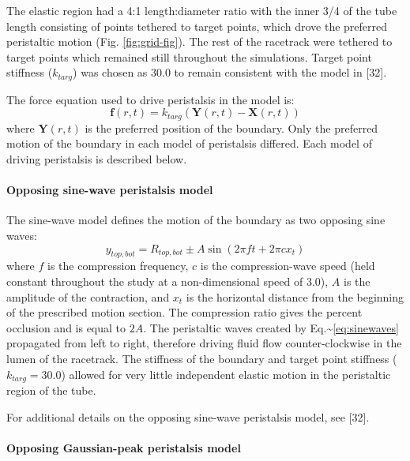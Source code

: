 \documentclass[
]{article}
\begin{document}
The elastic region had a 4:1 length:diameter ratio with the inner 3/4 of
the tube length consisting of points tethered to target points, which
drove the preferred peristaltic motion (Fig. \ref{fig:grid-fig}). The
rest of the racetrack were tethered to target points which remained
still throughout the simulations. Target point stiffness (\(k_{targ}\))
was chosen as 30.0 to remain consistent with the model in {[}32{]}.

The force equation used to drive peristalsis in the model is:
\begin{equation}
\mathbf{f}(r,t) = k_{targ}(\mathbf{Y}(r,t) - \mathbf{X}(r,t))
\label{eq:f}
\end{equation} where \(\mathbf{Y}(r,t)\) is the preferred position of
the boundary. Only the preferred motion of the boundary in each model of
peristalsis differed. Each model of driving peristalsis is described
below.

\hypertarget{opposing-sine-wave-peristalsis-model}{%
\paragraph{Opposing sine-wave peristalsis
model}\label{opposing-sine-wave-peristalsis-model}}

The sine-wave model defines the motion of the boundary as two opposing
sine waves: \begin{equation}
y_{top,bot} = R_{top,bot} \pm A \sin(2\pi f t+ 2\pi cx_t)
\label{eq:sinewaves}
\end{equation} where \(f\) is the compression frequency, \(c\) is the
compression-wave speed (held constant throughout the study at a
non-dimensional speed of 3.0), \(A\) is the amplitude of the
contraction, and \(x_t\) is the horizontal distance from the beginning
of the prescribed motion section. The compression ratio gives the
percent occlusion and is equal to \(2A\). The peristaltic waves created
by Eq.\textasciitilde{}\ref{eq:sinewaves} propagated from left to right,
therefore driving fluid flow counter-clockwise in the lumen of the
racetrack. The stiffness of the boundary and target point stiffness
(\(k_{targ}=30.0\)) allowed for very little independent elastic motion
in the peristaltic region of the tube.

For additional details on the opposing sine-wave peristalsis model, see
{[}32{]}.

\hypertarget{opposing-gaussian-peak-peristalsis-model}{%
\paragraph{Opposing Gaussian-peak peristalsis
model}\label{opposing-gaussian-peak-peristalsis-model}}
\end{document}
